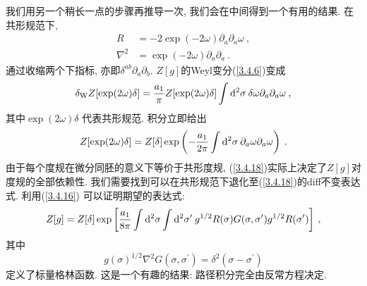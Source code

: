我们用另一个稍长一点的步骤再推导一次, 我们会在中间得到一个有用的结果. 在共形规范下,
\begin{subequations}\label{3.4.16}
\begin{align}
R&=-2 \exp (-2 \omega) \partial_{a} \partial_{a} \omega \:,\label{3.4.16a}\\
\nabla^{2}&=\exp (-2 \omega) \partial_{a} \partial_{a} \:. \label{3.4.16b}
\end{align}
\end{subequations}
通过收缩两个下指标, 亦即$\delta^{a b} \partial_{a} \partial_{b}$. $Z[g]$的Weyl变分(\ref{3.4.6})变成
\begin{equation}
\delta_{\mathrm{W}} Z[\exp (2 \omega) \delta]=\frac{a_{1}}{\pi} Z[\exp (2 \omega) \delta] \int \mathrm{d}^{2} \sigma\: \delta \omega \partial_{a} \partial_{a} \omega \:, \label{3.4.17}
\end{equation}
其中$\exp (2 \omega) \delta$ 代表共形规范. 积分立即给出
\begin{equation}\label{3.4.18}
Z[\exp (2 \omega) \delta]=Z[\delta] \exp \left(-\frac{a_{1}}{2 \pi} \int \mathrm{d}^{2} \sigma \: \partial_{a} \omega \partial_{a} \omega\right) \:.
\end{equation}
由于每个度规在微分同胚的意义下等价于共形度规, (\ref{3.4.18})实际上决定了$Z[g]$对度规的全部依赖性. 我们需要找到可以在共形规范下退化至(\ref{3.4.18})的diff不变表达式. 
利用(\ref{3.4.16}) 可以证明期望的表达式: 
\begin{equation}\label{3.4.19}
Z[g]=Z[\delta] \exp \left[\frac{a_{1}}{8 \pi} \int \mathrm{d}^{2} \sigma \int \mathrm{d}^{2} \sigma^{\prime} \: g^{1 / 2} R(\sigma) G(\sigma, \sigma^{\prime}) g^{1 / 2} R(\sigma^{\prime})\right] \:,
\end{equation}
其中
\begin{equation}
g(\sigma)^{1 / 2} \nabla^{2} G(\sigma, \sigma^{\prime})=\delta^{2}(\sigma-\sigma^{\prime}) \label{3.4.20}
\end{equation}
定义了标量格林函数. 这是一个有趣的结果: 路径积分完全由反常方程决定.


